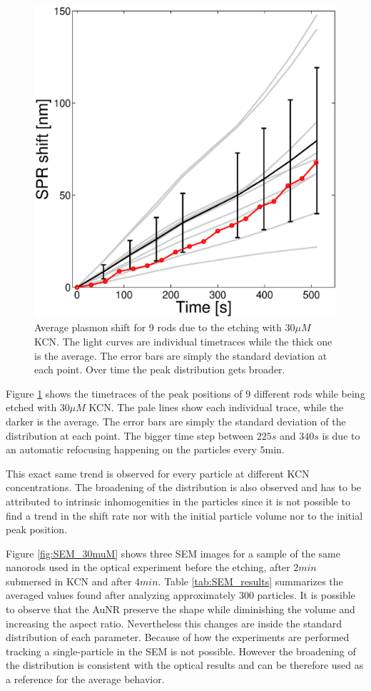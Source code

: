 \documentclass[twocolumn]{article}
\begin{document}
\begin{figure}[htb]
 \centering
 \includegraphics[width=0.9\linewidth]{plasmon_average.eps}
 \caption{Average plasmon shift for 9 rods due to the etching with $30\mu M$
 KCN. The light curves are individual timetraces while the thick one is the
 average. The error bars are simply the standard deviation at each point. Over
 time the peak distribution gets broader.}
 \label{fig:plasmon_average}
\end{figure}

Figure \ref{fig:plasmon_average} shows the timetraces of the peak positions of
$9$ different rods while being etched with $30\mu M$ KCN. The pale lines show
each individual trace, while the darker is the average. The error bars are simply the
standard deviation of the distribution at each point. The bigger time step
between $225s$ and $340s$ is due to an automatic refocusing happening on the
particles every $5\textrm{min}$. 

This exact same trend is observed for every particle at different KCN
concentrations. The broadening of the distribution is also observed and has to
be attributed to intrinsic inhomogenities in the particles since it is not
possible to find a trend in the shift rate nor with the initial particle 
volume nor to the initial peak position. 

Figure \ref{fig:SEM_30muM} shows three SEM images for a sample of the same
nanorods used in the optical experiment before the etching, after $2min$
submersed in KCN and after $4min$. Table \ref{tab:SEM_results} summarizes the
averaged values found after analyzing approximately $300$ particles. It is
possible to observe that the AuNR preserve the shape while diminishing the
volume and increasing the aspect ratio. Nevertheless this changes are
inside the standard distribution of each parameter. Because of how the
experiments are performed tracking a single-particle in the SEM is not
possible. However the broadening of the distribution is consistent with the
optical results and can be therefore used as a reference for the average
behavior.
\end{document}
